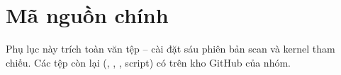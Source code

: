 \chapter{Mã nguồn chính}
\label{app:code}

Phụ lục này trích toàn văn tệp  -- cài đặt sáu phiên bản scan và kernel tham
chiếu. Các tệp còn lại (, , , script) có trên
kho GitHub của nhóm.


